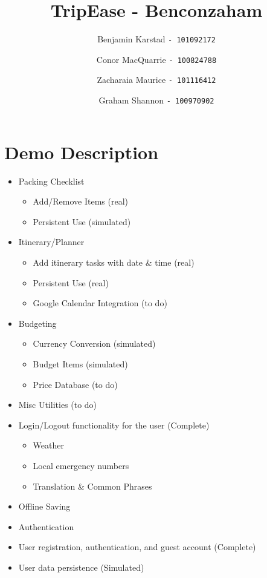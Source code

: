 \documentclass[12pt]{article}
\title{TripEase - Benconzaham}
\author{
Benjamin Karstad
\texttt{- 101092172}
\and
Conor MacQuarrie
\texttt{- 100824788}
\and
Zacharaia Maurice
\texttt{- 101116412}
\and
Graham Shannon
\texttt{- 100970902}
}
\begin{document}
	\maketitle

	\pagebreak

	\section*{Demo Description}

	\begin{itemize}

		\item{Packing Checklist}
		\begin{itemize}
			\item Add/Remove Items (real)
			\item Persistent Use (simulated)
		\end{itemize}

		\item{Itinerary/Planner}
		\begin{itemize}
			\item Add itinerary tasks with date \& time (real)
			\item Persistent Use (real)
			\item Google Calendar Integration (to do)
		\end{itemize}

		\item{Budgeting}
			\begin{itemize}
				\item Currency Conversion (simulated)
				\item Budget Items (simulated)
				\item Price Database (to do)
			\end{itemize}

		\item{Misc Utilities} (to do)

		\item Login/Logout functionality for the user (Complete)

		\begin{itemize}
			\item Weather
			\item Local emergency numbers
			\item Translation \& Common Phrases
		\end{itemize}

		\item{Offline Saving}

		\item{Authentication}
		    \item User registration, authentication, and guest account (Complete)
		    \item User data persistence  (Simulated)

	\end{itemize}
	
\end{document}
